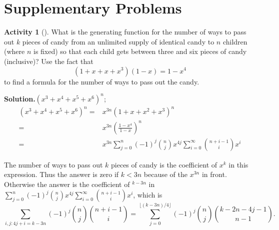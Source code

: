 \documentclass[10pt,]{book}
\theoremstyle{plain}
\theoremstyle{definition}
\newtheorem{activity}[project]{Activity}
\numberwithin{equation}{chapter}
\newcommand{\lt}{<}
\newcommand{\amp}{&}
\begin{document}
\section[{Supplementary Problems}]{Supplementary Problems}\label{sec_genfns-suppprobs}
\begin{activity}[]\label{candy-genfn}
What is the generating function for the number of ways to pass out \(k\) pieces of candy from an unlimited supply of identical candy to \(n\) children (where \(n\) is fixed) so that each child gets between three and six pieces of candy (inclusive)? Use the fact that%
\begin{equation*}
(1+x+x+x^3)(1-x) = 1-x^4
\end{equation*}
to find a formula for the number of ways to pass out the candy.%
\par\medskip\noindent%
\textbf{Solution.}\quad \((x^3+x^4+x^5+x^6)^n\);%
\begin{align*}
(x^3+x^4+x^5+x^6)^n =\amp x^{3n}(1+x+x^2+x^3)^n\\
=\amp x^{3n}\left(\frac{1-x^4}{1-x}\right)^n\\
=\amp x^{3n}\sum_{j=0}^n (-1)^j\binom{n}{j}x^{4j}\sum_{i=0}^\infty
\binom{n+i-1}{i}x^i
\end{align*}
%
\par
The number of ways to pass out \(k\) pieces of candy is the coefficient of \(x^k\) in this expression. Thus the answer is zero if \(k\lt 3n\) because of the \(x^{3n}\) in front. Otherwise the answer is the coefficient of \(^{k-3n}\) in \(\sum_{j=0}^n (-1)^j\binom{n}{j}x^{4j}\sum_{i=0}^\infty \binom{n+i-1}{i}x^i\), which is%
\begin{equation*}
\sum_{i,j:4j+i=k-3n}(-1)^j\binom{n}{j}\binom{n+i-1}{i}= \sum_{j=0}^{\lfloor (k-3n)/4\rfloor} (-1)^j\binom{n}{j}\binom{k-2n-4j-1}{n-1}.
\end{equation*}
%
\end{activity}
\end{document}
